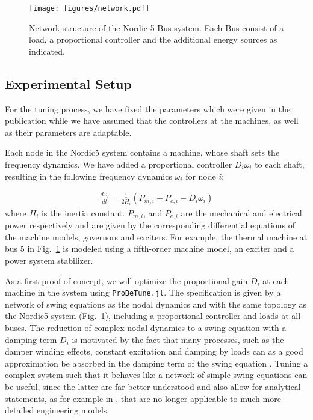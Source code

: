 \documentclass[conference]{IEEEtran}
\begin{document}
\begin{figure}[h]
    \centering
    \texttt{[image: figures/network.pdf]}
    \caption{Network structure of the Nordic 5-Bus system. Each Bus consist of a load, a proportional controller and the additional energy sources as indicated.  \label{fig:network}}
\end{figure}

\subsection{Experimental Setup}
For the tuning process, we have fixed the parameters which were given in the publication \cite{hydro_and_wind} while we have assumed that the controllers at the machines, as well as their parameters are adaptable.

Each node in the Nordic5 system contains a machine, whose shaft sets the frequency dynamics. We have added a proportional controller $D_i \omega_i$ to each shaft, resulting in the following frequency dynamics $\omega_i$ for node $i$:

    \begin{align}
        \frac{d\omega_i}{dt} = \frac{1}{2H_i}(P_{m,i} - P_{e,i} - D_i \omega_i)
    \end{align}
where $H_i$ is the inertia constant. $P_{m,i}$, and $ P_{e,i}$ are the mechanical and electrical power respectively and are given by the corresponding differential equations of the machine models, governors and exciters. For example, the thermal machine at bus 5 in Fig.~\ref{fig:network} is modeled using a fifth-order machine model, an exciter and a power system stabilizer.

As a first proof of concept, we will optimize the proportional gain $D_i$ at each machine in the system using \texttt{ProBeTune.jl}. The specification is given by a network of swing equations as the nodal dynamics and with the same topology as the Nordic5 system (Fig.~\ref{fig:network}), including a proportional controller and loads at all buses. The reduction of complex nodal dynamics to a swing equation with a damping term $D_i$ is motivated by the fact that many processes, such as the damper winding effects, constant excitation and damping by loads can as a good approximation be absorbed in the damping term of the swing equation \cite{sauer_pai, anderson_fouad}. Tuning a complex system such that it behaves like a network of simple swing equations can be useful, since the latter are far better understood and also allow for analytical statements, as for example in \cite{doerfler_2012}, that are no longer applicable to much more detailed engineering models.
\end{document}
